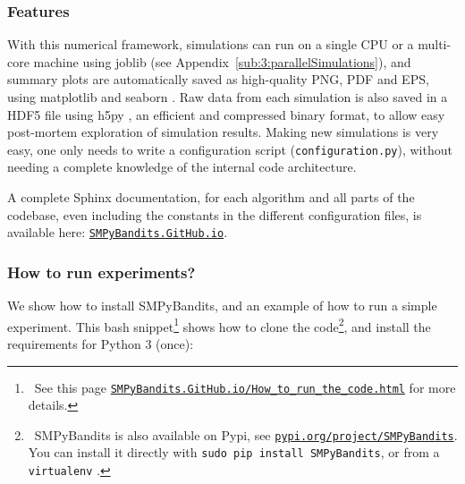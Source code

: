 \begin{small}
    \inputminted[linenos=true,numbersep=5pt,frame=lines,framesep=2mm]{python3}{2-Chapters/3-Chapter/src/example_of_a_IndexPolicy_UCB.py}
\end{small}


\subsubsection{Features}

With this numerical framework, simulations can run on a single CPU or a multi-core machine using joblib \cite{joblib} (see Appendix~\ref{sub:3:parallelSimulations}),
and summary plots are automatically saved as high-quality PNG, PDF and EPS, using matplotlib \cite{matplotlib} and seaborn \cite{seaborn}.
Raw data from each simulation is also saved in a HDF5 file using h5py \cite{h5py}, an efficient and compressed binary format, to allow easy post-mortem exploration of simulation results.
Making new simulations is very easy, one only needs to write a configuration script (\texttt{configuration.py}), without needing a complete knowledge of the internal code architecture.

A complete Sphinx documentation, for each algorithm and all parts of the codebase, even including the constants in the different configuration files, is available here: \texttt{\href{https://SMPyBandits.GitHub.io}{SMPyBandits.GitHub.io}}.


\subsubsection{How to run experiments?}

We show how to install SMPyBandits, and an example of how to run a simple experiment.
This bash snippet\footnote{~See this page \texttt{\href{https://SMPyBandits.GitHub.io/How_to_run_the_code.html}{SMPyBandits.GitHub.io/How\_to\_run\_the\_code.html}} for more details.} shows how to clone the code\footnote{~SMPyBandits is also available on Pypi, see \texttt{\href{https://pypi.org/project/SMPyBandits/}{pypi.org/project/SMPyBandits}}. You can install it directly with \texttt{sudo pip install SMPyBandits}, or from a \texttt{virtualenv} \cite{virtualenv}.},
and install the requirements for Python 3 (once):

